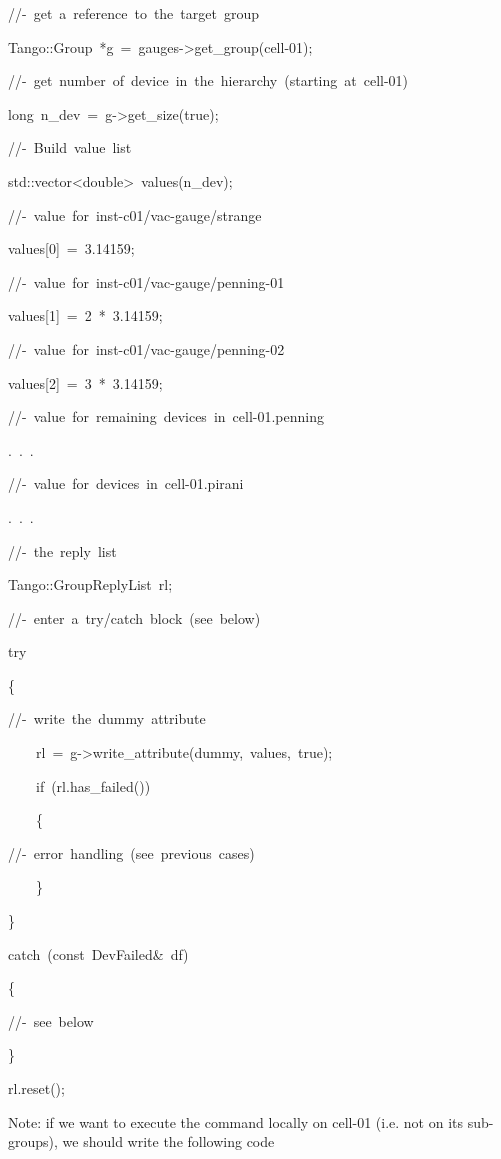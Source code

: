 
\begin{lyxcode}
//-~get~a~reference~to~the~target~group

Tango::Group~{*}g~=~gauges->get\_group(\textquotedbl{}cell-01\textquotedbl{});

//-~get~number~of~device~in~the~hierarchy~(starting~at~cell-01)

long~n\_dev~=~g->get\_size(true);

//-~Build~value~list

std::vector<double>~values(n\_dev);

//-~value~for~inst-c01/vac-gauge/strange

values{[}0{]}~=~3.14159;

//-~value~for~inst-c01/vac-gauge/penning-01

values{[}1{]}~=~2~{*}~3.14159;

//-~value~for~inst-c01/vac-gauge/penning-02

values{[}2{]}~=~3~{*}~3.14159;

//-~value~for~remaining~devices~in~cell-01.penning

.~.~.

//-~value~for~devices~in~cell-01.pirani

.~.~.

//-~the~reply~list

Tango::GroupReplyList~rl;

//-~enter~a~try/catch~block~(see~below)

try

\{

//-~write~the~\textquotedbl{}dummy\textquotedbl{}~attribute

~~~~rl~=~g->write\_attribute(\textquotedbl{}dummy\textquotedbl{},~values,~true);

~~~~if~(rl.has\_failed())

~~~~\{

//-~error~handling~(see~previous~cases)

~~~~\}

\}

catch~(const~DevFailed\&~df)

\{

//-~see~below

\}

rl.reset();
\end{lyxcode}


Note: if we want to execute the command locally on \textquotedbl{}cell-01\textquotedbl{}
(i.e. not on its sub-groups), we should write the following code

